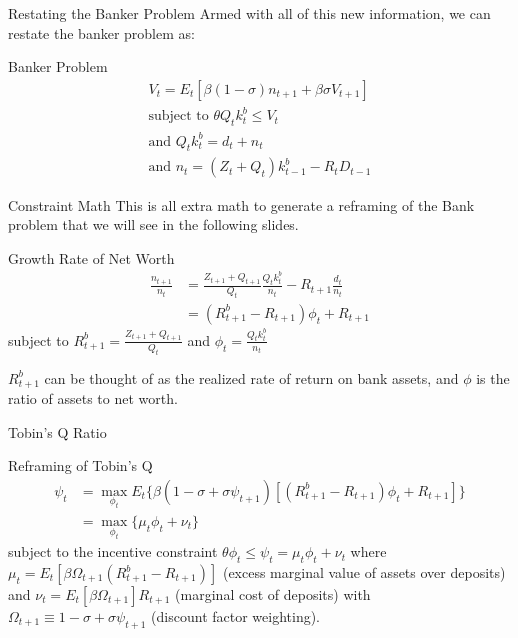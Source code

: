 \documentclass[
	11pt, %
	aspectratio=169, %
]{beamer}
\begin{document}
\begin{frame}{Restating the Banker Problem}
    Armed with all of this new information, we can restate the banker problem as:
    \begin{block}{Banker Problem}
        \begin{align*}
        &V_t=E_t\left[\beta(1-\sigma)n_{t+1}+\beta\sigma V_{t+1}\right]&\\
        &\text{subject to } \theta Q_tk_t^b\leq V_t&\\
        &\text{and } Q_tk_t^b=d_t+n_t&\\
        &\text{and } n_t=(Z_t+Q_t)k_{t-1}^b-R_{t}D_{t-1}&
    \end{align*}
    \end{block}
\end{frame}
\begin{frame}{Constraint Math}
    This is all extra math to generate a reframing of the Bank problem that we will see in the following slides.
    \begin{block}{Growth Rate of Net Worth}
        \begin{align*}
            \frac{n_{t+1}}{n_t}&=\frac{Z_{t+1}+Q_{t+1}}{Q_t}\frac{Q_tk^b_t}{n_t}-R_{t+1}\frac{d_t}{n_t}\\
            &=(R_{t+1}^b-R_{t+1})\phi_t+R_{t+1}
        \end{align*}
        subject to $R_{t+1}^b=\frac{Z_{t+1}+Q_{t+1}}{Q_t}$ and $\phi_t=\frac{Q_tk_t^b}{n_t}$
    \end{block}
$R_{t+1}^b$ can be thought of as the realized rate of return on bank assets, and $\phi$ is the ratio of assets to 
net worth.
\end{frame}
\begin{frame}{Tobin's Q Ratio}
    \begin{block}{Reframing of Tobin's Q}
        \begin{align*}
            \psi_t&=\underset{\phi_t}{\max}E_t\{\beta(1-\sigma+\sigma\psi_{t+1})\left[(R_{t+1}^b-R_{t+1})\phi_t+R_{t+1}\right]\}\\
            &=\underset{\phi_t}{\max}\{\mu_t\phi_t+\nu_t\}
        \end{align*}
        subject to the incentive constraint $\theta \phi_t \leq \psi_t=\mu_t\phi_t+\nu_t$ where $\mu_t=E_t\left[\beta\Omega_{t+1}(R_{t+1}^b-R_{t+1})\right]$ (excess marginal value of assets over deposits)
        and $\nu_t=E_t\left[\beta\Omega_{t+1}\right]R_{t+1}$ (marginal cost of deposits) with $\Omega_{t+1}\equiv 1-\sigma+\sigma\psi_{t+1}$ (discount factor weighting).
    \end{block}
\end{frame}
\end{document}
